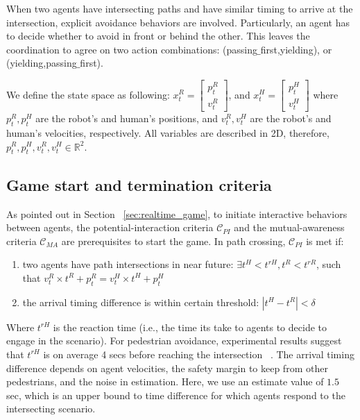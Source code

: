 \documentclass[letterpaper, 10 pt, conference]{ieeeconf}  %
\begin{document}
When two agents have intersecting paths and have similar timing to arrive at the intersection, explicit avoidance behaviors are involved. Particularly, an agent has to decide whether to avoid in front or behind the other. This leaves the coordination to agree on two action combinations: (passing$\_$first,yielding), or (yielding,passing$\_$first). 

We define the state space as following: $x_t^R = \begin{bmatrix}
p^R_t\\
v^R_t
\end{bmatrix}$, and $x_t^H = \begin{bmatrix}
p^H_t\\
v^H_t
\end{bmatrix}$
where $p^R_t, p^H_t$ are the robot's and human's positions, and $v^R_t,v^H_t$ are the robot's and human's velocities, respectively. All variables are described in 2D, therefore, $p^R_t,p^H_t,v^R_t,v^H_t \in \mathbb{R}^2$. 

\subsection{Game start and termination criteria}
As pointed out in Section ~\ref{sec:realtime_game}, to initiate interactive 
behaviors between agents, the potential-interaction criteria $\mathcal{C}_{PI}$ 
and the mutual-awareness criteria $\mathcal{C}_{MA}$ are prerequisites to start the 
game. In path crossing, $\mathcal{C}_{PI}$ is met if:
\begin{enumerate}
  \item two agents have path intersections in near future: 
    $\exists t^H<t^{rH}, t^R<t^{rR}$, such that $v^R_t \times t^R + p^R_t = v^H_t \times t^H +p^H_t$
  \item the arrival timing difference is within certain threshold: $|t^H-t^R|<\delta$
\end{enumerate}
Where $t^{rH}$ is the reaction time (i.e., the time its take to agents to decide to 
engage in the scenario). For pedestrian avoidance, experimental results suggest 
that $t^{rH}$ is on average 4 secs before reaching the intersection ~\cite{pettre2009experiment}. The arrival timing difference depends on agent velocities, the safety margin to keep from other pedestrians, and the noise in estimation. Here, we use an estimate value of $1.5$ sec, which is an upper bound to time difference for which agents respond to the intersecting scenario.
\end{document}
